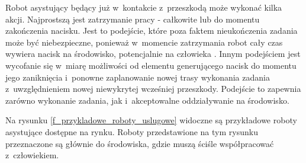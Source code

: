 Robot asystujący będący już w~kontakcie z~przeszkodą może wykonać kilka akcji. Najprostszą jest zatrzymanie pracy - całkowite lub do momentu zakończenia nacisku. Jest to podejście, które poza faktem nieukończenia zadania może być niebezpieczne, ponieważ w~momencie zatrzymania robot cały czas wywiera nacisk na środowisko, potencjalnie na człowieka \cite{b_konf_collision_1}.
Innym podejściem jest wycofanie się w~miarę możliwości od elementu generującego nacisk do momentu jego zaniknięcia i~ponowne zaplanowanie nowej trasy wykonania zadania z~uwzględnieniem nowej niewykrytej wcześniej przeszkody. Podejście to zapewnia zarówno wykonanie zadania, jak i~akceptowalne oddziaływanie na środowisko.

Na rysunku \ref{f_przykladowe_roboty_uslugowe} widoczne są przykładowe roboty asystujące dostępne na rynku. Roboty przedstawione na tym rysunku przeznaczone są głównie do środowiska, gdzie muszą ściśle współpracować z~człowiekiem.

